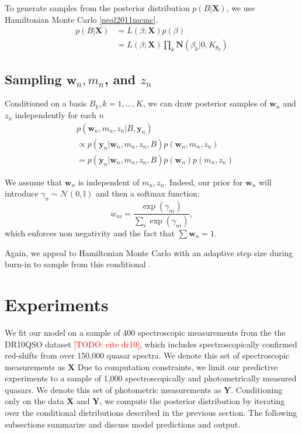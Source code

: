 \documentclass{article}
\newcommand{\red}[1]{\textcolor{red}{[TODO: #1]}}
\begin{document}
To generate samples from the posterior distribution $p(B | \mathbf{X})$, we use Hamiltonian Monte Carlo \ref{neal2011mcmc}. 
\begin{align}
  p(B | \mathbf{X}) 
    &= L(\beta; \mathbf{X}) p(\beta) \\
    &= L(\beta; \mathbf{X}) \prod_{k} \mathbf{N}(\beta_k | 0, K_{\theta_k})
\end{align}

\subsection{Sampling $\mathbf{w}_n, m_n$, and $z_n$}
Conditioned on a basis $B_k, k=1,\dots, K$, we can draw posterior samples of $\mathbf{w}_n$ and $z_n$ independently for each $n$
\begin{align}
  &p(\mathbf{w}_n, m_n, z_n | B, \mathbf{y}_n) \\
  &\propto p(\mathbf{y}_n | \mathbf{w}_n, m_n, z_n, B) p(\mathbf{w}_n, m_n, z_n) \\
  &= p(\mathbf{y}_n | \mathbf{w}_n, m_n, z_n, B) p(\mathbf{w}_n) p(m_n, z_n)
\end{align}

We assume that $\mathbf{w}_n$ is independent of $m_n, z_n$. Indeed, our prior for $\mathbf{w}_n$ will 
introduce $\gamma_n \sim \mathcal{N}(0, \mathbb{I})$ and then a softmax function:
\begin{equation*}
w_{ni} = \frac{\exp(\gamma_{ni})}{\sum_i {\exp(\gamma_{ni})}},
\end{equation*}
which enforces non negativity and the fact that $\sum \mathbf{w}_n = 1$.

Again, we appeal to Hamiltonian Monte Carlo with an adaptive step size during burn-in to sample from this conditional \cite{neal2011mcmc}. 



\section{Experiments}
\label{sec:experiments}
We fit our model on a sample of 400 spectroscopic measurements from the the DR10QSO dataset \red{cite dr10}, which includes spectroscopically confirmed red-shifts from over 150,000 quasar spectra.  
We denote this set of spectroscopic measurements  as $\mathbf{X}$  
Due to computation constraints, we limit our predictive experiments to a sample of 1,000 spectroscopically and photometrically measured quasars.  We denote this set of photometric measurements as $\mathbf{Y}$.  
Conditioning only on the data $\mathbf{X}$ and $\mathbf{Y}$, we compute the posterior distribution by iterating over the conditional distributions described in the previous section.  
The following subsections summarize and discuss model predictions and output.  
\end{document}
